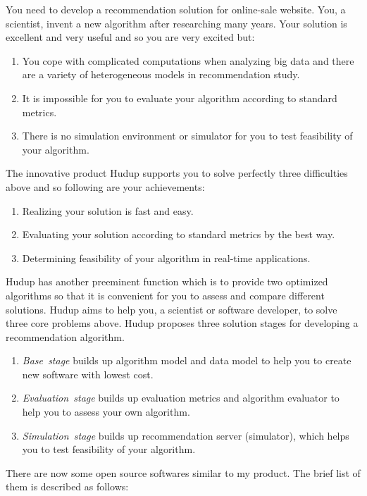 \documentclass[a4paper,twoside]{article}
\begin{document}
You need to develop a recommendation solution for online-sale website. You, a scientist, invent a new algorithm after researching many years. Your solution is excellent and very useful and so you are very excited but:
\begin{enumerate}
\item You cope with complicated computations when analyzing big data and there are a variety of heterogeneous models in recommendation study.
\item It is impossible for you to evaluate your algorithm according to standard metrics.
\item There is no simulation environment or simulator for you to test feasibility of your algorithm.
\end{enumerate}
The innovative product Hudup supports you to solve perfectly three difficulties above and so following are your achievements:
\begin{enumerate}
\item Realizing your solution is fast and easy.
\item Evaluating your solution according to standard metrics by the best way.
\item Determining feasibility of your algorithm in real-time applications.
\end{enumerate}
Hudup has another preeminent function which is to provide two optimized algorithms so that it is convenient for you to assess and compare different solutions. Hudup aims to help you, a scientist or software developer, to solve three core problems above. Hudup proposes three solution stages for developing a recommendation algorithm.
\begin{enumerate}
\item \textit{Base~stage} builds up algorithm model and data model to help you to create new software with lowest cost.
\item \textit{Evaluation~stage} builds up evaluation metrics and algorithm evaluator to help you to assess your own algorithm.
\item \textit{Simulation~stage} builds up recommendation server (simulator), which helps you to test feasibility of your algorithm.
\end{enumerate}
There are now some open source softwares similar to my product. The brief list of them is described as follows:
\end{document}
